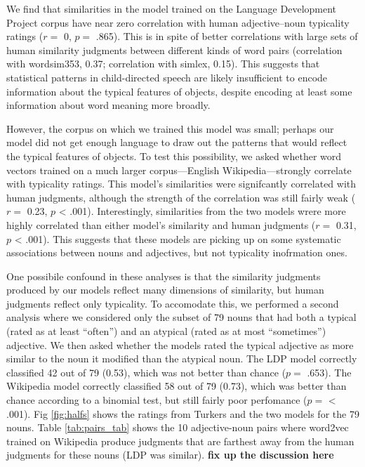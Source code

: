 \documentclass[10pt, letterpaper]{article}
\begin{document}
We find that similarities in the model trained on the Language
Development Project corpus have near zero correlation with human
adjective--noun typicality ratings (\(r =\) 0, \(p =\) .865). This is in
spite of better correlations with large sets of human similarity
judgments between different kinds of word pairs (correlation with
wordsim353, 0.37; correlation with simlex, 0.15). This suggests that
statistical patterns in child-directed speech are likely insufficient to
encode information about the typical features of objects, despite
encoding at least some information about word meaning more broadly.

However, the corpus on which we trained this model was small; perhaps
our model did not get enough language to draw out the patterns that
would reflect the typical features of objects. To test this possibility,
we asked whether word vectors trained on a much larger corpus---English
Wikipedia---strongly correlate with typicality ratings. This model's
similarities were signifcantly correlated with human judgments, although
the strength of the correlation was still fairly weak (\(r =\) 0.23,
\(p\) \textless{} .001). Interestingly, similarities from the two models
wrere more highly correlated than either model's similarity and human
judgments (\(r =\) 0.31, \(p\) \textless{} .001). This suggests that
these models are picking up on some systematic associations between
nouns and adjectives, but not typicality inofrmation ones.

One possibile confound in these analyses is that the similarity
judgments produced by our models reflect many dimensions of similarity,
but human judgments reflect only typicality. To accomodate this, we
performed a second analysis where we considered only the subset of 79
nouns that had both a typical (rated as at least ``often'') and an
atypical (rated as at most ``sometimes'') adjective. We then asked
whether the models rated the typical adjective as more similar to the
noun it modified than the atypical noun. The LDP model correctly
classified 42 out of 79 (0.53), which was not better than chance
(\(p =\) .653). The Wikipedia model correctly classified 58 out of 79
(0.73), which was better than chance according to a binomial test, but
still fairly poor perfomance (\(p =\) \textless{} .001). Fig
\ref{fig:halfs} shows the ratings from Turkers and the two models for
the 79 nouns. Table \ref{tab:pairs_tab} shows the 10 adjective-noun
pairs where word2vec trained on Wikipedia produce judgments that are
farthest away from the human judgments for these nouns (LDP was
similar). \textbf{fix up the discussion here}
\end{document}
